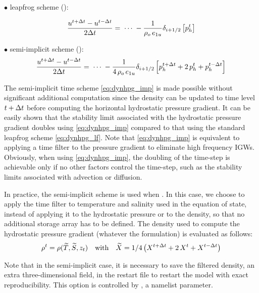 \documentclass[../tex_main/NEMO_manual]{subfiles}
\begin{document}
$\bullet$ leapfrog scheme ():

\begin{equation} \label{eq:dynhpg_lf}
\frac{u^{t+\Delta t}-u^{t-\Delta t}}{2\Delta t} = \;\cdots \;
	-\frac{1}{\rho _o \,e_{1u} }\delta _{i+1/2} \left[ {p_h^t } \right]
\end{equation}

$\bullet$ semi-implicit scheme ():
\begin{equation} \label{eq:dynhpg_imp}
\frac{u^{t+\Delta t}-u^{t-\Delta t}}{2\Delta t} = \;\cdots \;
	-\frac{1}{4\,\rho _o \,e_{1u} } \delta_{i+1/2} \left[ p_h^{t+\Delta t} +2\,p_h^t +p_h^{t-\Delta t}  \right]
\end{equation}

The semi-implicit time scheme \autoref{eq:dynhpg_imp} is made possible without
significant additional computation since the density can be updated to time level $t+\Delta t$ before
computing the horizontal hydrostatic pressure gradient.
It can be easily shown that the stability limit associated with the hydrostatic pressure gradient doubles using
\autoref{eq:dynhpg_imp} compared to that using the standard leapfrog scheme \autoref{eq:dynhpg_lf}.
Note that \autoref{eq:dynhpg_imp} is equivalent to applying a time filter to the pressure gradient to
eliminate high frequency IGWs.
Obviously, when using \autoref{eq:dynhpg_imp},
the doubling of the time-step is achievable only if no other factors control the time-step,
such as the stability limits associated with advection or diffusion.

In practice, the semi-implicit scheme is used when .
In this case, we choose to apply the time filter to temperature and salinity used in the equation of state,
instead of applying it to the hydrostatic pressure or to the density,
so that no additional storage array has to be defined.
The density used to compute the hydrostatic pressure gradient (whatever the formulation) is evaluated as follows:
\begin{equation} \label{eq:rho_flt}
	\rho^t = \rho( \widetilde{T},\widetilde {S},z_t)
 \quad	  \text{with}	\quad 
	\widetilde{X} = 1 / 4 \left(  X^{t+\Delta t} +2 \,X^t + X^{t-\Delta t}  \right)
\end{equation}

Note that in the semi-implicit case, it is necessary to save the filtered density,
an extra three-dimensional field, in the restart file to restart the model with exact reproducibility.
This option is controlled by  , a namelist parameter.
\end{document}
